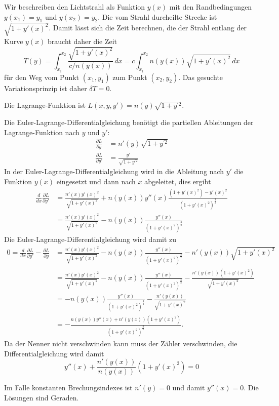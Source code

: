 \begin{loesung}
\begin{teilaufgaben}
\item
Wir beschreiben den Lichtstrahl als Funktion $y(x)$ mit den Randbedingungen
\(
y(x_1)=y_1
\)
und
\(
y(x_2)=y_2
\).
Die vom Strahl durcheilte Strecke ist $\!\sqrt{1+y'(x)^2}$.
Damit lässt sich die Zeit berechnen, die der Strahl entlang der
Kurve $y(x)$ braucht daher die Zeit
\[
T(y)
=
\int_{x_1}^{x_2}
\frac{\!\sqrt{1+y'(x)^2}}{c/n(y(x))}
\,dx
=
c
\int_{x_1}^{x_2}
n(y(x))
\sqrt{1+y'(x)^2}
\,dx
\]
für den Weg vom Punkt $(x_1,y_1)$ zum Punkt $(x_2,y_2)$.
Das gesuchte Variationsprinzip ist daher $\delta T=0$.
\item
Die Lagrange-Funktion ist
\(
L(x,y,y') = n(y)\sqrt{1+y^{\prime 2}}
\).
\item
Die Euler-Lagrange-Differentialgleichung benötigt die partiellen
Ableitungen der Lagrange-Funktion nach $y$ und $y'$:
\begin{align*}
\frac{\partial L}{\partial y}
&=
n'(y) \sqrt{1+y^{\prime 2}}
\\
\frac{\partial L}{\partial y'}
&=
\frac{y'}{\!\sqrt{1+y^{\prime 2}}}
\end{align*}
In der Euler-Lagrange-Differentialgleichung wird in die Ableitung nach $y'$
die Funktion $y(x)$ eingesetzt und dann nach $x$ abgeleitet, dies ergibt
\begin{align*}
\frac{d}{dx}
\frac{\partial L}{\partial y'}
&=
\frac{n'(x) y'(x)^2}{\!\sqrt{1+y'(x)^2}}
+
n(y(x))
y''(x)
\frac{
(1+y'(x)^2) - y'(x)^2
}{
(1+y'(x)^2)^{\frac32}
}
\\
&=
\frac{n'(x) y'(x)^2}{\!\sqrt{1+y'(x)^2}}
-
n(y(x))
\frac{
y''(x)
}{
(1+y'(x)^2)^{\frac32}
}
\end{align*}
Die Euler-Lagrange-Differentialgleichung wird damit zu
\begin{align*}
0
=
\frac{d}{dx}\frac{\partial L}{\partial y'}
-
\frac{\partial L}{\partial y}
&=
\frac{n'(x) y'(x)^2}{\!\sqrt{1+y'(x)^2}}
-
n(y(x))
\frac{
y''(x)
}{
(1+y'(x)^2)^{\frac32}
}
-
n'(y(x))\sqrt{1+y'(x)^2}
\\
&=
\frac{
n'(x) y'(x)^2
}{
\!\sqrt{1+y'(x)^2}
}
-
n(y(x))
\frac{
y''(x)
}{
(1+y'(x)^2)^{\frac32}
}
-
\frac{
n'(y(x))(1+y'(x)^2)
}{
\!\sqrt{1+y'(x)^2}
}
\\
&=
-
n(y(x))
\frac{
y''(x)
}{
(1+y'(x)^2)^{\frac32}
}
-
\frac{
n'(y(x))
}{
\!\sqrt{1+y'(x)^2}
}
\\
&=
-
\frac{
n(y(x))
y''(x)
+
n'(y(x))
(1+y'(x)^2)
}{
(1+y'(x)^2)^{\frac32}
}.
\end{align*}
Da der Nenner nicht verschwinden kann muss der Zähler verschwinden,
die Differentialgleichung wird damit
\[
y''(x) + \frac{n'(y(x))}{n(y(x))} (1 + y'(x)^2) = 0
\]
\item
Im Falle konstanten Brechungsindexes ist $n'(y)=0$ und damit $y''(x)=0$.
Die Lösungen sind Geraden.
\qedhere
\end{teilaufgaben}
\end{loesung}


